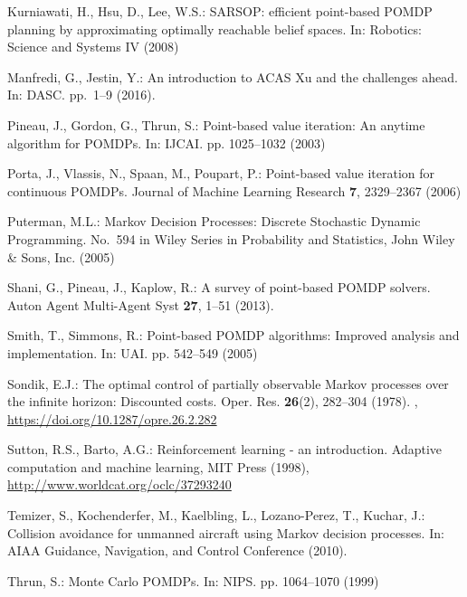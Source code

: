 \documentclass[orivec]{llncs}
\begin{document}
\begin{thebibliography}{10}
Kurniawati, H., Hsu, D., Lee, W.S.: {SARSOP:} efficient point-based {POMDP}
  planning by approximating optimally reachable belief spaces. In: Robotics:
  Science and Systems IV (2008)

Manfredi, G., Jestin, Y.: An introduction to {ACAS Xu} and the challenges
  ahead. In: DASC. pp.~1--9 (2016). 

Pineau, J., Gordon, G., Thrun, S.: Point-based value iteration: An anytime
  algorithm for {POMDPs}. In: IJCAI. pp. 1025--1032 (2003)

Porta, J., Vlassis, N., Spaan, M., Poupart, P.: Point-based value iteration for
  continuous {POMDPs}. Journal of Machine Learning Research  \textbf{7},
  2329--2367 (2006)

Puterman, M.L.: {Markov} Decision Processes: Discrete Stochastic Dynamic
  Programming. No.~594 in Wiley Series in Probability and Statistics, John
  Wiley \& Sons, Inc. (2005)

Shani, G., Pineau, J., Kaplow, R.: A survey of point-based {POMDP} solvers.
  Auton Agent Multi-Agent Syst  \textbf{27},  1--51 (2013).

Smith, T., Simmons, R.: Point-based {POMDP} algorithms: Improved analysis and
  implementation. In: UAI. pp. 542--549 (2005)

Sondik, E.J.: The optimal control of partially observable {Markov} processes
  over the infinite horizon: Discounted costs. Oper. Res.  \textbf{26}(2),
  282--304 (1978). ,
  \url{https://doi.org/10.1287/opre.26.2.282}

Sutton, R.S., Barto, A.G.: Reinforcement learning - an introduction. Adaptive
  computation and machine learning, {MIT} Press (1998),
  \url{http://www.worldcat.org/oclc/37293240}

Temizer, S., Kochenderfer, M., Kaelbling, L., Lozano-Perez, T., Kuchar, J.:
  Collision avoidance for unmanned aircraft using {Markov} decision processes.
  In: AIAA Guidance, Navigation, and Control Conference (2010).

Thrun, S.: {Monte Carlo} {POMDPs}. In: NIPS. pp. 1064--1070 (1999)

\end{thebibliography}
\end{document}

